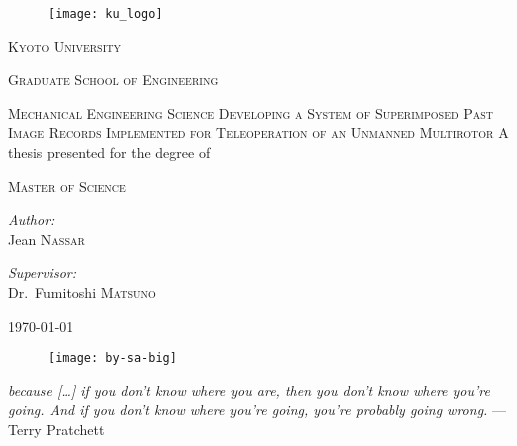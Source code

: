 \begin{titlepage}
  \begin{center}
    \noindent

    \begin{figure}[h]
      \centering
      \texttt{[image: ku\_logo]}
    \end{figure}
    \textsc{\LARGE Kyoto University}
    
    \textsc{\Large Graduate School of Engineering}

    \textsc{\large Mechanical Engineering Science}
    \vfill\vfill
    \textsc{\large Developing a System of Superimposed Past Image Records Implemented for Teleoperation of an Unmanned Multirotor}  %
    \vfill\vfill
    {\large A thesis presented for the degree of}

    \textsc{\large Master of Science}
    \vfill\vfill
    \begin{minipage}[t]{0.4\textwidth}
      \begin{flushleft}
	\emph{Author:}\\
	Jean \textsc{Nassar}
      \end{flushleft}
    \end{minipage}
    \begin{minipage}[t]{0.4\textwidth}
      \begin{flushright}
	\emph{Supervisor:}\\
	Dr.~Fumitoshi \textsc{Matsuno}
      \end{flushright}
    \end{minipage}
    \vfill
    \today
    \begin{figure}[h]
      \centering
      \texttt{[image: by-sa-big]}
    \end{figure}
  \end{center}
\end{titlepage}

\thispagestyle{empty}
  \null{}
    \begin{flushright}
      \emph{
	because [\ldots] if you don't know where you are, then you don't know where you're going.
	And if you don't know where you're going, you're probably going wrong.
      } --- Terry Pratchett
    \end{flushright}
  \null

